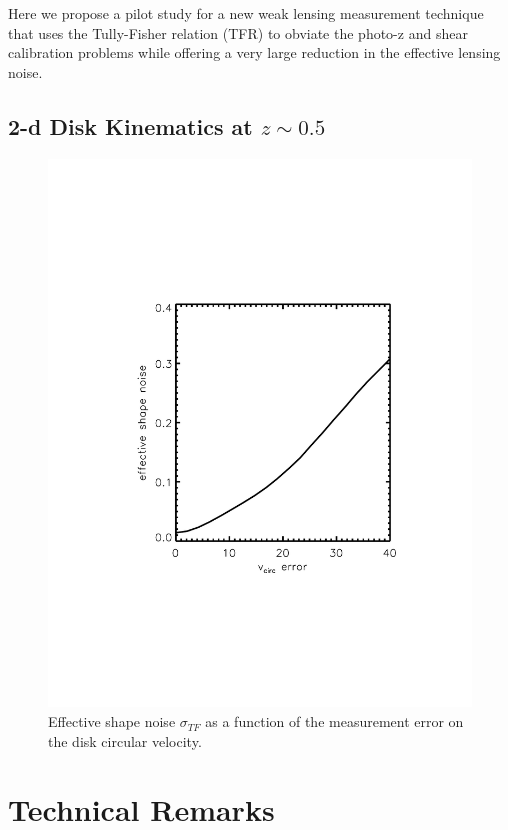 \documentclass[11pt,preprint]{aastex}
\begin{document}
Here we propose a pilot study for a new weak lensing measurement technique that uses the Tully-Fisher relation (TFR) to obviate the photo-z and shear calibration problems while offering a very large reduction in the effective lensing noise.

\subsection{2-d Disk Kinematics at $z\sim0.5$}

\begin{figure}[t]
\includegraphics[width=\linewidth, bb= 150 150 550 650,clip]{Plots/vcirc_error.pdf}
\caption{Effective shape noise $\sigma_{TF}$ as a  function of the
  measurement error on the disk circular velocity.}
\label{fig:shapeNoise}
\end{figure}




\section{Technical Remarks}
\end{document}
